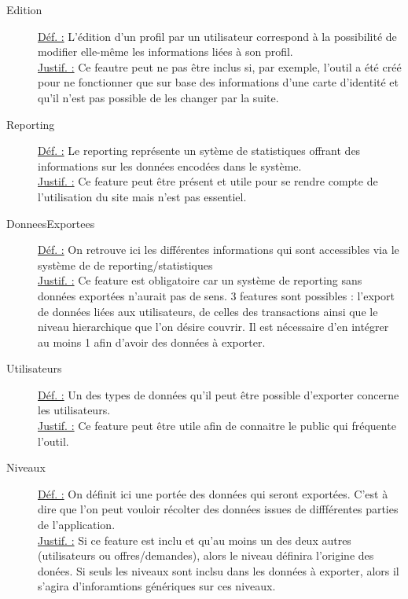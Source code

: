 \begin{description}
\item [Edition]
\underline{Déf. :}  L'édition d'un profil par un utilisateur correspond à la possibilité de modifier elle-même les informations liées à son profil.  
\\ \underline{Justif. :}  Ce feautre peut ne pas être inclus si,  par exemple,  l'outil a été créé pour ne fonctionner que sur base des informations d'une carte d'identité et qu'il n'est pas possible de les changer par la suite.
\newline

\begin{center}
\end{center}

\item [Reporting]
\underline{Déf. :}  Le reporting représente un sytème de statistiques offrant des informations sur les données encodées dans le système.  
\\ \underline{Justif. :}  Ce feature peut être présent et utile pour se rendre compte de l'utilisation du site mais n'est pas essentiel.
\newline

\item [DonneesExportees]
\underline{Déf. :}  On retrouve ici les différentes informations qui sont accessibles via le système de de reporting/statistiques
\\ \underline{Justif. :}  Ce feature est obligatoire car un système de reporting sans données exportées n'aurait pas de sens.  3 features sont possibles : l'export de données liées aux utilisateurs,  de celles des transactions ainsi que le niveau hierarchique que l'on désire couvrir.  Il est nécessaire d'en intégrer au moins 1 afin d'avoir des données à exporter.  

\item [Utilisateurs]
\underline{Déf. :}  Un des types de données qu'il peut être possible d'exporter concerne les utilisateurs.
\\ \underline{Justif. :}  Ce feature peut être utile afin de connaitre le public qui fréquente l'outil.
\newline

\item [Niveaux]
\underline{Déf. :}  On définit ici une portée des données qui seront exportées.  C'est à dire que l'on peut vouloir récolter des données issues de diffférentes parties de l'application.
\\ \underline{Justif. :}  Si ce feature est inclu et qu'au moins un des deux autres (utilisateurs ou offres/demandes),  alors le niveau définira l'origine des donées.  Si seuls les niveaux sont inclsu dans les données à exporter,  alors il s'agira d'inforamtions génériques sur ces niveaux.  
\newline


\end{description}
